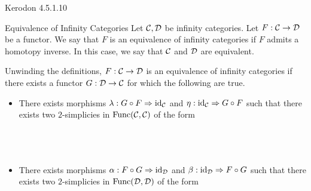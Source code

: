 \documentclass[a4paper]{article}
\begin{document}
Kerodon 4.5.1.10\\

\begin{defn}{Equivalence of Infinity Categories}{} Let $\mathcal{C},\mathcal{D}$ be infinity categories. Let $F:\mathcal{C}\to\mathcal{D}$ be a functor. We say that $F$ is an equivalence of infinity categories if $F$ admits a homotopy inverse. In this case, we say that $\mathcal{C}$ and $\mathcal{D}$ are equivalent. 
\end{defn}

Unwinding the definitions, $F:\mathcal{C}\to\mathcal{D}$ is an equivalence of infinity categories if there exists a functor $G:\mathcal{D}\to\mathcal{C}$ for which the following are true. 
\begin{itemize}
\item There exists morphisms $\lambda:G\circ F\Rightarrow\text{id}_{\mathcal{C}}$ and $\eta:\text{id}_{\mathcal{C}}\Rightarrow G\circ F$ such that there exists two $2$-simplicies in $\text{Func}(\mathcal{C},\mathcal{C})$ of the form \\~\\
\\~\\
\item There exists morphisms $\alpha:F\circ G\Rightarrow\text{id}_{\mathcal{D}}$ and $\beta:\text{id}_{\mathcal{D}}\Rightarrow F\circ G$ such that there exists two $2$-simplicies in $\text{Func}(\mathcal{D},\mathcal{D})$ of the form \\~\\
\\~\\
\end{itemize}
\end{document}
